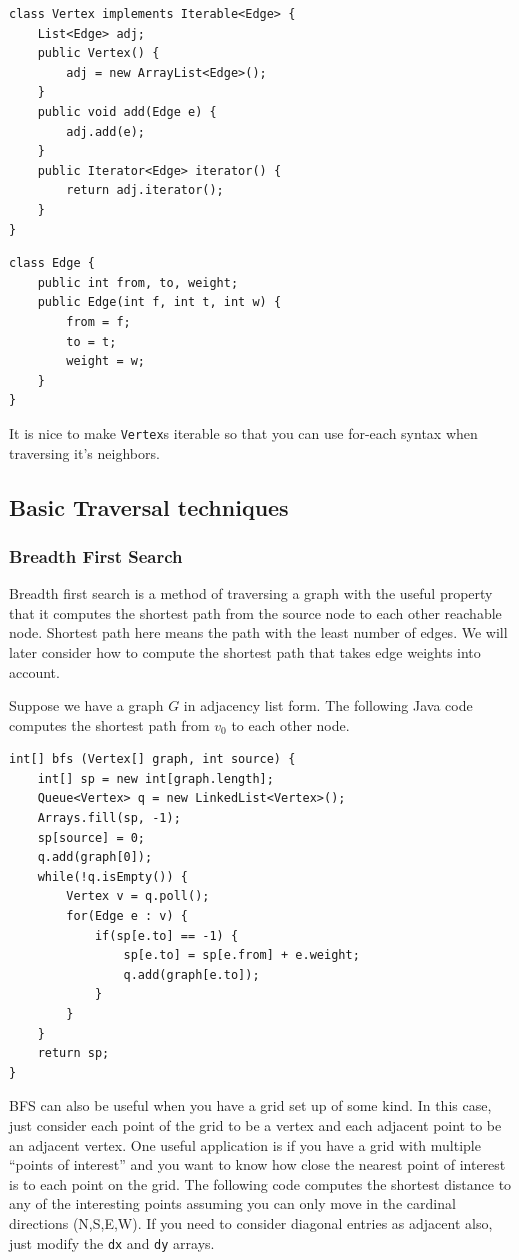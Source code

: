 \documentclass[a4paper,12pt]{article}
\begin{document}
\begin{lstlisting}
class Vertex implements Iterable<Edge> {
	List<Edge> adj;
	public Vertex() {
		adj = new ArrayList<Edge>();
	}
	public void add(Edge e) {
		adj.add(e);
	}
	public Iterator<Edge> iterator() {
		return adj.iterator();
	}
}
\end{lstlisting}

\begin{lstlisting}
class Edge {
	public int from, to, weight;
	public Edge(int f, int t, int w) {
		from = f;
		to = t;
		weight = w;
	}
}
\end{lstlisting}

It is nice to make \verb|Vertex|s iterable so that you can use for-each syntax when traversing it's neighbors. 

\subsection{Basic Traversal techniques}

\subsubsection{Breadth First Search}

Breadth first search is a method of traversing a graph with the useful property that it computes the shortest path from the source node to each other reachable node. Shortest path here means the path with the least number of edges. We will later consider how to compute the shortest path that takes edge weights into account.

Suppose we have a graph $G$ in adjacency list form. The following Java code computes the shortest path from $v_0$ to each other node. 

\begin{lstlisting}
int[] bfs (Vertex[] graph, int source) {
	int[] sp = new int[graph.length];
	Queue<Vertex> q = new LinkedList<Vertex>();
	Arrays.fill(sp, -1);
	sp[source] = 0;
	q.add(graph[0]);
	while(!q.isEmpty()) {
		Vertex v = q.poll();
		for(Edge e : v) {
			if(sp[e.to] == -1) {
				sp[e.to] = sp[e.from] + e.weight;
				q.add(graph[e.to]);
			}
		}
	}
	return sp;
}
\end{lstlisting}

BFS can also be useful when you have a grid set up of some kind. In this case, just consider each point of the grid to be a vertex and each adjacent point to be an adjacent vertex. One useful application is if you have a grid with multiple ``points of interest'' and you want to know how close the nearest point of interest is to each point on the grid. The following code computes the shortest distance to any of the interesting points assuming you can only move in the cardinal directions (N,S,E,W). If you need to consider diagonal entries as adjacent also, just modify the \verb|dx| and \verb|dy| arrays.
\end{document}
